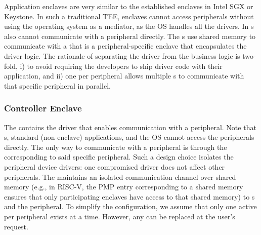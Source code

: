 Application enclaves are very similar to the established enclaves in Intel SGX or Keystone. In such a traditional TEE, enclaves cannot access peripherals without using the operating system as a mediator, as the OS handles all the drivers. In \name \app{}s also cannot communicate with a peripheral directly. The \app{}s use shared memory to communicate with a \ce that is a peripheral-specific enclave that encapsulates the driver logic. The rationale of separating the driver from the business logic is two-fold, i) to avoid requiring the developers to ship driver code with their application, and ii) one \ce per peripheral allows multiple \app{}s to communicate with that specific peripheral in parallel. %


\subsubsection{Controller Enclave} 
\label{sec:programmingModel:systemComponents:ce}

The \ce contains the driver that enables communication with a peripheral. Note that \app{}s, standard (non-enclave) applications, and the OS cannot access the peripherals directly. The only way to communicate with a peripheral is through the \ce corresponding to said specific peripheral. Such a design choice isolates the peripheral device drivers: one compromised driver does not affect other peripherals. The \ce maintains an isolated communication channel over shared memory (e.g., in RISC-V, the PMP entry corresponding to a shared memory ensures that only participating enclaves have access to that shared memory) to \app{}s and the peripheral. To simplify the configuration, we assume that only one active \ce per peripheral exists at a time. However, any \ce can be replaced at the user's request. %


